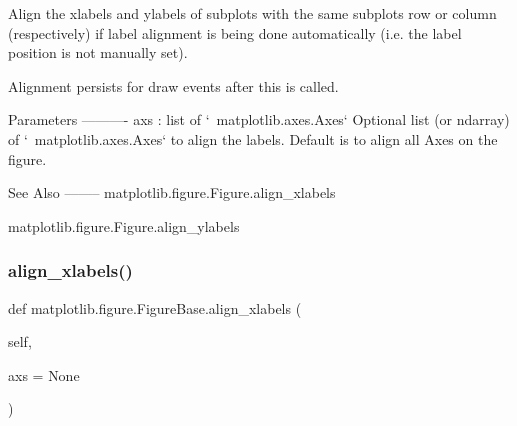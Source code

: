 \begin{DoxyVerb}Align the xlabels and ylabels of subplots with the same subplots
row or column (respectively) if label alignment is being
done automatically (i.e. the label position is not manually set).

Alignment persists for draw events after this is called.

Parameters
----------
axs : list of `~matplotlib.axes.Axes`
    Optional list (or ndarray) of `~matplotlib.axes.Axes`
    to align the labels.
    Default is to align all Axes on the figure.

See Also
--------
matplotlib.figure.Figure.align_xlabels

matplotlib.figure.Figure.align_ylabels
\end{DoxyVerb}
 \mbox{\label{classmatplotlib_1_1figure_1_1FigureBase_af0abd276bf4f5130daf17b2d5d58c620}} 
\subsubsection{\texorpdfstring{align\+\_\+xlabels()}{align\_xlabels()}}
{\footnotesize\ttfamily def matplotlib.\+figure.\+Figure\+Base.\+align\+\_\+xlabels (\begin{DoxyParamCaption}\item[{}]{self,  }\item[{}]{axs = {\ttfamily None} }\end{DoxyParamCaption})}

